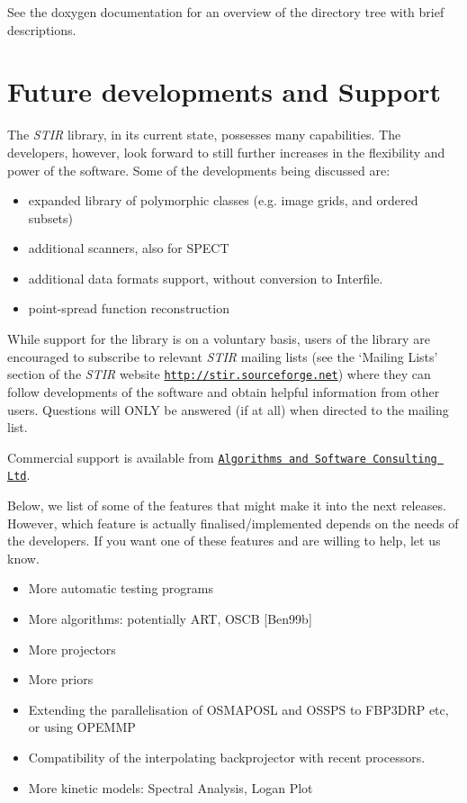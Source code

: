 \documentclass{article}
\def\url#1#2{\mbox{\href{#1}{\tt #2}}}
\begin{document}
{{See the doxygen documentation for an overview of the directory tree with brief descriptions.

\section{
Future developments and Support}

The \textit{STIR} library, in its current state, possesses many capabilities. 
The developers, however, look forward to still further increases 
in the flexibility and power of the software. Some of the developments 
being discussed are:

\begin{itemize}
\item
expanded library of polymorphic classes (e.g. image grids, and 
ordered subsets)
\item
additional scanners, also for SPECT
\item
additional data formats support, without conversion to Interfile.
\item
point-spread function reconstruction
\end{itemize}


While support for the library is on a voluntary basis, users 
of the library are encouraged to subscribe to relevant \textit{STIR} 
mailing lists (see the `Mailing Lists' section of the \textit{STIR} website 
\url{http://stir.sourceforge.net/ }{http://stir.sourceforge.net}) 
where they can follow developments of the software and obtain 
helpful information from other users. Questions will ONLY be 
answered (if at all) when directed to the mailing list.

Commercial support is available from \url{http://asc.uk.com}{Algorithms and
Software Consulting Ltd}.

Below, we list of some of the features that might make it into the next releases. 
However, which feature is actually finalised/implemented depends 
on the needs of the developers. If you want one of these features 
and are willing to help, let us know.
\begin{itemize}
\item
More automatic testing programs
\item
More algorithms: potentially ART,  
OSCB [Ben99b] 
\item
More projectors
\item
More priors
\item
Extending the parallelisation of OSMAPOSL and OSSPS to FBP3DRP etc, or using OPEMMP
\item
Compatibility of the interpolating backprojector with recent 
processors.
\item
More kinetic models: Spectral Analysis, Logan Plot
\end{itemize}





}}
\end{document}
